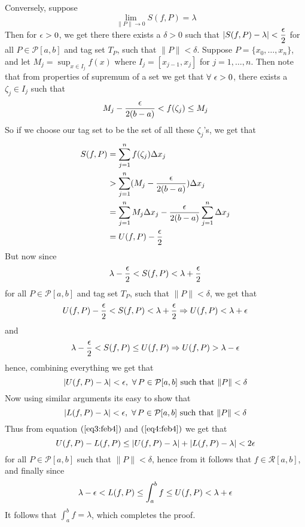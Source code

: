 \begin{prf}
    Conversely, suppose \[ \lim_{\|P\| \to 0} S(f,P) = \lambda \]
    Then for $\epsilon > 0$, we get there there exists a $\delta > 0$ such that $|S(f,P) - \lambda| < \displaystyle{\frac{\epsilon}{2}}$ for all $P \in \mathcal{P}[a,b]$ and tag set $T_P$, such that $\|P\| < \delta$. Suppose $P = \{x_0, \dots, x_n\}$, and let $M_j = \sup_{x \in I_j} f(x)$ where $I_j = [x_{j-1},x_j]$ for $j = 1, \dots, n$. Then note that from properties of supremum of a set we get that $\forall \ \epsilon > 0$, there exists a $\zeta_j \in I_j$ such that \[ M_j - \frac{\epsilon}{2(b-a)} < f(\zeta_j) \leq M_j \] So if we choose our tag set to be the set of all these $\zeta_j$'s, we get that 
    \begin{align*}
        S(f,P) &= \sum_{j=1}^n f(\zeta_j) \Delta x_j \\ 
               &> \sum_{j=1}^n (M_j - \frac{\epsilon}{2(b-a)}) \Delta x_j \\ 
               &= \sum_{j=1}^n M_j \Delta x_j - \frac{\epsilon}{2(b-a)} \sum_{j=1}^n \Delta x_j \\ 
               &= U(f,P) - \frac{\epsilon}{2}
    \end{align*}
    But now since 
    \[
        \lambda-\frac{\epsilon}{2} < S(f,P) < \lambda + \frac{\epsilon}{2}  
    \]
    for all $P \in \mathcal{P}[a,b]$ and tag set $T_P$, such that $\|P\| < \delta$, we get that 
    \[
        U(f,P) - \frac{\epsilon}{2} < S(f,P) < \lambda + \frac{\epsilon}{2} \Rightarrow U(f,P) < \lambda + \epsilon   
    \]
    and 
    \[
        \lambda - \frac{\epsilon}{2} < S(f,P) \leq U(f,P) \Rightarrow U(f,P) > \lambda - \epsilon   
    \]
    hence, combining everything we get that 
    \begin{equation}\label{eq3:feb4}
        |U(f,P) - \lambda| < \epsilon, \ \forall \, P \in \mathcal{P}[a,b] \mbox{ such that } \|P\| < \delta
    \end{equation}
    Now using similar arguments its easy to show that 
    \begin{equation}\label{eq4:feb4}
        |L(f,P) - \lambda| < \epsilon, \ \forall \, P \in \mathcal{P}[a,b] \mbox{ such that } \|P\| < \delta
    \end{equation}
    Thus from equation $(\ref{eq3:feb4})$ and $(\ref{eq4:feb4})$ we get that 
    \[
        U(f,P) - L(f,P) \leq |U(f,P) - \lambda| + |L(f,P)-\lambda| < 2\epsilon  
    \] 
    for all $P \in \mathcal{P}[a,b]$ such that $\|P\| < \delta$, hence from  it follows that $f \in \mathcal{R}[a,b]$, and finally since 
    \[ \lambda - \epsilon < L(f,P) \leq \int_a^b f \leq U(f,P) < \lambda + \epsilon \]
    It follows that $\int_a^b f = \lambda$, which completes the proof.
\end{prf}

